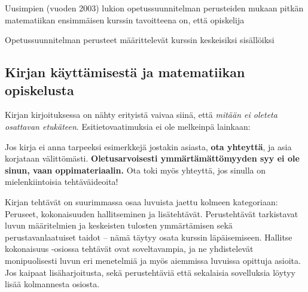 Uusimpien (vuoden 2003) lukion opetussuunnitelman perusteiden mukaan pitkän matematiikan ensimmäisen kurssin tavoitteena on, että opiskelija

Opetussuunnitelman perusteet määrittelevät kurssin keskeisiksi sisällöiksi


\newpage

\subsection*{Kirjan käyttämisestä ja matematiikan opiskelusta}

Kirjan kirjoituksessa on nähty erityistä vaivaa siinä, että \textit{mitään ei oleteta osattavan etukäteen}. Esitietovaatimuksia ei ole melkeinpä lainkaan:


Jos kirja ei anna tarpeeksi esimerkkejä jostakin asiasta, \textbf{ota yhteyttä}, ja asia korjataan välittömästi. \textbf{Oletusarvoisesti ymmärtämättömyyden syy ei ole sinun, vaan oppimateriaalin.} Ota toki myös yhteyttä, jos sinulla on mielenkiintoisia tehtäväideoita!

Kirjan tehtävät on suurimmassa osaa luvuista jaettu kolmeen kategoriaan: Peruseet, kokonaisuuden hallitseminen ja lisätehtävät. Perustehtävät tarkistavat luvun määritelmien ja keskeisten tulosten ymmärtämisen sekä perustavanlaatuiset taidot -- nämä täytyy osata kurssin läpäisemiseen. Hallitse kokonaisuus -osiossa tehtävät ovat soveltavampia, ja ne yhdistelevät monipuolisesti luvun eri menetelmiä ja myös aiemmissa luvuissa opittuja asioita. Jos kaipaat lisäharjoitusta, sekä perustehtäviä että sekalaisia sovelluksia löytyy lisää kolmannesta osiosta.

